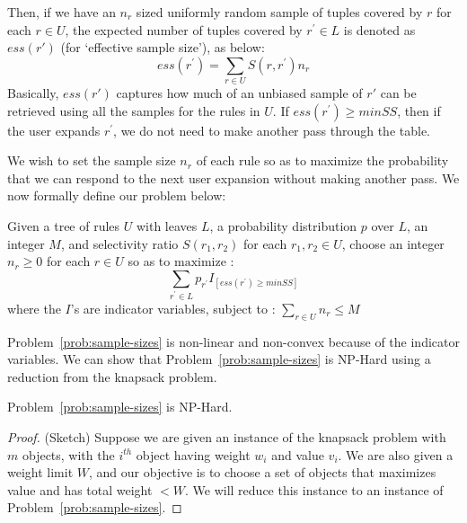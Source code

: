 {Then, if we have an $n_r$ sized uniformly random sample of tuples covered by $r$ for each $r \in U$, the expected number of tuples covered by $r^{\prime} \in L$ is denoted as $ess(r')$ (for `effective sample size'), as below: 
\begin{equation} \label{def:ess}
ess(r^{\prime}) = \sum_{r \in U} S(r, r^{\prime})n_r
\end{equation}
Basically, $ess(r')$ captures how much of an unbiased sample of $r'$ can be retrieved using all the samples for the rules in $U$.
If $ess(r^{\prime}) \geq minSS$, then if the user expands $r^{\prime}$, we do not need to make another 
pass through the table.

We wish to set the sample size $n_r$ of each rule so as to maximize the probability that we can respond to the next user expansion without making another pass. We now formally define our problem below:
\begin{problem}\label{prob:sample-sizes}
Given a tree of rules $U$ with leaves $L$, a probability distribution $p$ over $L$, an integer $M$, and selectivity ratio $S(r_1, r_2)$ for each $r_1, r_2 \in U$, 
choose an integer $n_r \geq 0$ for each $r \in U$ so as to $\textrm{maximize}$ :
$$\sum_{r^{\prime} \in L} p_{r^{\prime}}I_{[ess(r^{\prime}) \geq minSS]}$$
where the $I$'s are indicator variables, subject to :
$\sum_{r \in U} n_r \leq M$
\end{problem}
Problem~\ref{prob:sample-sizes} is non-linear and non-convex because of the indicator variables. 
We can show that Problem~\ref{prob:sample-sizes} is {\sc NP-Hard} using a reduction from the knapsack problem. 
\begin{lemma}\label{lemma:sampling-hardness}
Problem~\ref{prob:sample-sizes} is {\sc NP-Hard}.
\end{lemma}
\begin{proof}(Sketch)
Suppose we are given an instance of the knapsack problem with $m$ objects, with the $i^{th}$ object having weight $w_i$ and value $v_i$. We are also given a weight limit $W$, and our objective is to choose a set of objects that maximizes value and has total weight $< W$. We will reduce this instance to an instance of Problem~\ref{prob:sample-sizes}.


\end{proof}}
